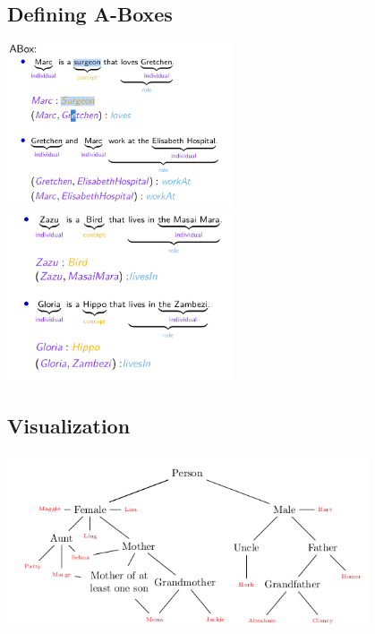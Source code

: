 \documentclass[conference]{styles/acmsiggraph}
\begin{document}
\subsection{Defining A-Boxes}

\includegraphics[width=0.5\textwidth]{imgs/abox1.png}
\includegraphics[width=0.5\textwidth]{imgs/abox2.png}\\

\subsection{Visualization}

\includegraphics[width=0.8\textwidth]{imgs/tree.png}\\
\end{document}
